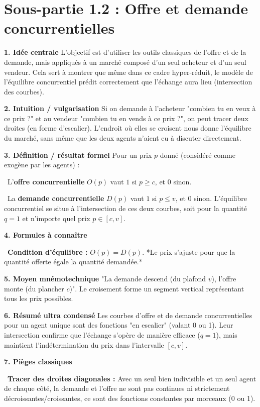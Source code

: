 \documentclass[11pt, a4paper]{report}
\begin{document}
\section{Sous-partie 1.2 : Offre et demande concurrentielles}

\textbf{1. Idée centrale}
L'objectif est d'utiliser les outils classiques de l'offre et de la demande, mais appliqués à un marché composé d'un seul acheteur et d'un seul vendeur. Cela sert à montrer que même dans ce cadre hyper-réduit, le modèle de l'équilibre concurrentiel prédit correctement que l'échange aura lieu (intersection des courbes). 

\textbf{2. Intuition / vulgarisation}
Si on demande à l'acheteur "combien tu en veux à ce prix ?" et au vendeur "combien tu en vends à ce prix ?", on peut tracer deux droites (en forme d'escalier). L'endroit où elles se croisent nous donne l'équilibre du marché, sans même que les deux agents n'aient eu à discuter directement.

\textbf{3. Définition / résultat formel}
Pour un prix $p$ donné (considéré comme exogène par les agents) :
\par \textbullet\ L'\textbf{offre concurrentielle} $O(p)$ vaut $1$ si $p \ge c$, et $0$ sinon.
\par \textbullet\ La \textbf{demande concurrentielle} $D(p)$ vaut $1$ si $p \le v$, et $0$ sinon.
L'équilibre concurrentiel se situe à l'intersection de ces deux courbes, soit pour la quantité $q=1$ et n'importe quel prix $p \in [c, v]$.

\textbf{4. Formules à connaître}
\par \textbullet\ \textbf{Condition d'équilibre :} $O(p) = D(p)$. *Le prix s'ajuste pour que la quantité offerte égale la quantité demandée.*

\textbf{5. Moyen mnémotechnique}
"La demande descend (du plafond $v$), l'offre monte (du plancher $c$)". Le croisement forme un segment vertical représentant tous les prix possibles.

\textbf{6. Résumé ultra condensé}
Les courbes d'offre et de demande concurrentielles pour un agent unique sont des fonctions "en escalier" (valant 0 ou 1). Leur intersection confirme que l'échange s'opère de manière efficace ($q=1$), mais maintient l'indétermination du prix dans l'intervalle $[c, v]$.

\textbf{7. Pièges classiques}
\par \textbullet\ \textbf{Tracer des droites diagonales :} Avec un seul bien indivisible et un seul agent de chaque côté, la demande et l'offre ne sont pas continues ni strictement décroissantes/croissantes, ce sont des fonctions constantes par morceaux (0 ou 1).
\end{document}
